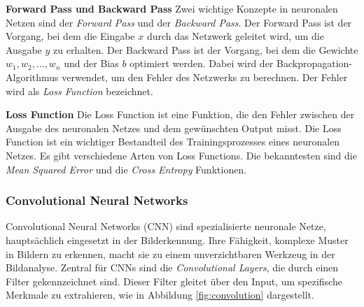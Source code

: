 \documentclass[11pt,a4paper]{article}
\begin{document}
\noindent \newline \textbf{Forward Pass und Backward Pass} \newline
Zwei wichtige Konzepte in neuronalen Netzen sind der \textit{Forward Pass} und der
\textit{Backward Pass}. Der Forward Pass ist der Vorgang, bei dem die Eingabe \(x\) durch das
Netzwerk geleitet wird, um die Ausgabe \(y\) zu erhalten. Der Backward Pass ist der Vorgang, bei
dem die Gewichte \(w_{1}, w_{2}, \dots, w_{n}\) und der Bias \(b\) optimiert werden. Dabei wird 
der Backpropagation-Algorithmus verwendet, um den Fehler des Netzwerks zu berechnen. Der Fehler 
wird als \textit{Loss Function} bezeichnet.

\noindent \newline \textbf{Loss Function} \newline
Die Loss Function ist eine Funktion, die den Fehler zwischen der Ausgabe des neuronalen Netzes und
dem gewünschten Output misst. Die Loss Function ist ein wichtiger Bestandteil des Trainingsprozesses
eines neuronalen Netzes. Es gibt verschiedene Arten von Loss Functions. Die bekanntesten sind die
\textit{Mean Squared Error} und die \textit{Cross Entropy} Funktionen.


\subsubsection{Convolutional Neural Networks}
Convolutional Neural Networks (CNN) sind spezialisierte neuronale Netze, hauptsächlich eingesetzt 
in der Bilderkennung. Ihre Fähigkeit, komplexe Muster in Bildern zu erkennen, macht sie zu einem 
unverzichtbaren Werkzeug in der Bildanalyse. Zentral für CNNs sind die 
\textit{Convolutional Layers}, die durch einen Filter gekennzeichnet sind. Dieser Filter gleitet 
über den Input, um spezifische Merkmale zu extrahieren, wie in Abbildung \ref{fig:convolution} 
dargestellt.
\end{document}
